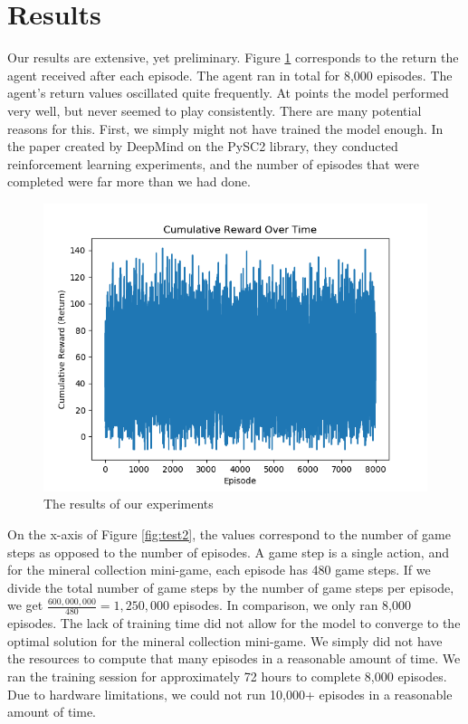 \documentclass[12pt]{article}
\begin{document}
\section*{\Large Results}

Our results are extensive, yet preliminary. Figure \ref{fig:test1} corresponds to the return the agent received after each episode.  The agent ran in total for 8,000 episodes. The agent's return values oscillated quite frequently. At points the model performed very well, but never seemed to play consistently. There are many potential reasons for this. First, we simply might not have trained the model enough. In the paper created by DeepMind on the PySC2 library, they conducted reinforcement learning experiments, and the number of episodes that were completed were far more than we had done. 

\begin{figure} [H]
    \centering
    \includegraphics[width=.75\textwidth, height=.4\textheight]{rewardLine.png}
    \caption{The results of our experiments}
    \label{fig:test1}
\end{figure}



On the x-axis of Figure \ref{fig:test2}, the values correspond to the number of game steps as opposed to the number of episodes. A game step is a single action, and for the mineral collection mini-game, each episode has 480 game steps.  If we divide the total number of game steps by the number of game steps per episode, we get $\frac{600,000,000}{480} = 1,250,000 $ episodes.  In comparison, we only ran 8,000 episodes.  The lack of training time did not allow for the model to converge to the optimal solution for the mineral collection mini-game.  We simply did not have the resources to compute that many episodes in a reasonable amount of time.  We ran the training session for approximately 72 hours to complete 8,000 episodes.  Due to hardware limitations, we could not run 10,000+ episodes in a reasonable amount of time.  
\end{document}
